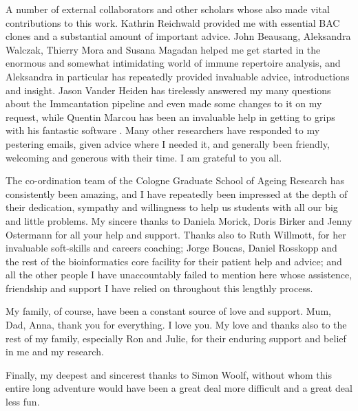 \begin{acknowledgements}
A number of external collaborators and other scholars whose also made vital contributions to this work. Kathrin Reichwald provided me with essential BAC clones and a substantial amount of important advice. John Beausang, Aleksandra Walczak, Thierry Mora and Susana Magadan helped me get started in the enormous and somewhat intimidating world of immune repertoire analysis, and Aleksandra in particular has repeatedly provided invaluable advice, introductions and insight. Jason Vander Heiden has tirelessly answered my many questions about the Immcantation pipeline and even made some changes to it on my request, while Quentin Marcou has been an invaluable help in getting to grips with his fantastic software . Many other researchers have responded to my pestering emails, given advice where I needed it, and generally been friendly, welcoming and generous with their time. I am grateful to you all.

The co-ordination team of the Cologne Graduate School of Ageing Research has consistently been amazing, and I have repeatedly been impressed at the depth of their dedication, sympathy and willingness to help us students with all our big and little problems. My sincere thanks to Daniela Morick, Doris Birker and Jenny Ostermann for all your help and support. Thanks also to Ruth Willmott, for her invaluable soft-skills and careers coaching; Jorge Boucas, Daniel Rosskopp and the rest of the bioinformatics core facility for their patient help and advice; and all the other people I have unaccountably failed to mention here whose assistence, friendship and support I have relied on throughout this lengthly process.

My family, of course, have been a constant source of love and support. Mum, Dad, Anna, thank you for everything. I love you. My love and thanks also to the rest of my family, especially Ron and Julie, for their enduring support and belief in me and my research. 

Finally, my deepest and sincerest thanks to Simon Woolf, without whom this entire long adventure would have been a great deal more difficult and a great deal less fun.
\end{acknowledgements}